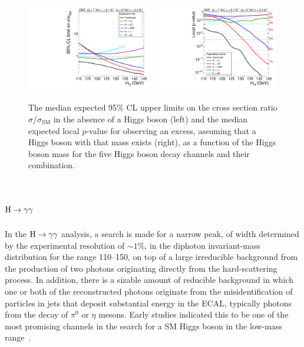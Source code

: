 \documentclass[11pt,twoside,a4paper,cmspaper,final,collab]{cms-tdr}
\begin{document}
\begin{figure}
\centering
\includegraphics[width=0.49\textwidth]{figures/comb/sqr_acls_allexp_bydecay_smallGGScale} \hfill
\includegraphics[width=0.49\textwidth]{figures/comb/sqr_pvala_allexp_bydecay_smallGGScale_wideX}
\caption{ The median expected 95\% CL upper limits on the cross section ratio
$ \sigma / \sigma_{\mathrm{SM}}$ in the absence of a Higgs boson
(left) and the median expected local $p$-value for observing an excess,
assuming that a Higgs boson with that mass exists (right),
as a function of the Higgs boson mass for the five Higgs boson decay channels and their combination.
}
\label{fig:sensitivity}
\end{figure}




\section{\texorpdfstring{$\mathrm{H}\to\gamma\gamma$}{H to gamma gamma}\label{sec:hgg}}

In the $\mathrm{H}\to\gamma\gamma$ analysis, a search is made for a narrow peak,
of width determined by the experimental resolution of ${\sim}1\%$,
in the diphoton
invariant-mass distribution for the range 110--150\GeV,
on top of a large irreducible background
from the production of two photons originating directly from the hard-scattering process.
In addition, there is a sizable amount of reducible background in which one or both
of the reconstructed photons originate from the misidentification of
particles  in jets that deposit substantial energy in the ECAL, typically photons from
the decay of $\pi^0$ or $\eta$ mesons.
Early studies indicated this to be one of the most promising channels
in the search for a SM Higgs boson in the low-mass range~\cite{Seez1990a}.
\end{document}
